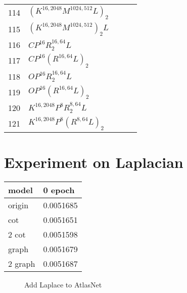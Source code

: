 \begin{appendices}
\begin{table*}
\begin{tabular}{| l | l | l | l}
		114&$(K^{16,2048}M^{1024,512}L)_2$ &~&~\\
		115&$(K^{16,2048}M^{1024,512})_2L$ &~&~\\
		116&$CP^{16}R^{16,64}_2L$ &~&~\\
		117&$CP^{16}(R^{16,64}L)_2$ &~&~\\
		118&$OP^{16}R^{16,64}_2L$ &~&~\\
		119&$OP^{16}(R^{16,64}L)_2$ &~&~\\
		120&$K^{16,2048}P^{8}R^{8,64}_2L$ &~&~\\
		121&$K^{16,2048}P^{8}(R^{8,64}L)_2$ &~&~\\
	\end{tabular}
\end{table*}
\newpage
\section{Experiment on Laplacian}
\begin{table*}
\label{tab:lpl}
\centering
\begin{tabular}{| l | l |}
model  &   0 epoch   \\
\hline
origin &   0.0051685 \\
cot    &   0.0051651 \\
2 cot   &  0.0051598 \\
graph   &  0.0051679 \\
2 graph &  0.0051687 \\
\end{tabular}
\end{table*}
\begin{figure}[htbp]
	\centering
	\caption{Add Laplace to AtlasNet}
	\label{fig:atlasnet_lpl}
\end{figure}
\newpage

\end{appendices}
